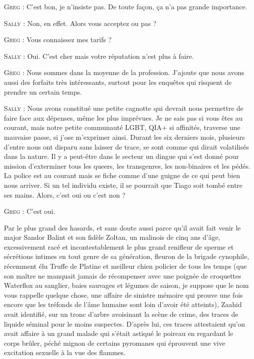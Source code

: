 \begin{dialogue}

\textsc{Greg} : C’est bon, je n’insiste pas. De toute façon, ça n’a pas grande importance.

\textsc{Sally} : Non, en effet. Alors vous acceptez ou pas ?

\textsc{Greg} : Vous connaissez mes tarifs ?

\textsc{Sally} : Oui. C’est cher mais votre réputation n’est plus à faire.

\textsc{Greg} : Nous sommes dans la moyenne de la profession. J’ajoute que nous avons aussi des forfaits très intéressants, surtout pour les enquêtes qui risquent de prendre un certain temps.

\textsc{Sally} : Nous avons constitué une petite cagnotte qui devrait nous permettre de faire face aux dépenses, même les plus imprévues. Je ne sais pas si vous êtes au courant, mais notre petite communauté LGBT, QIA+ si affinités, traverse une mauvaise passe, si j’ose m’exprimer ainsi. Durant les six derniers mois, plusieurs d’entre nous ont disparu sans laisser de trace, se sont comme qui dirait volatilisés dans la nature. Il y a peut-être dans le secteur un dingue qui s’est donné pour mission d’exterminer tous les queers, les transgenres, les non-binaires et les pédés. La police est au courant mais se fiche comme d’une guigne de ce qui peut bien nous arriver. Si un tel individu existe, il se pourrait que Tiago soit tombé entre ses mains. Alors, c’est oui ou c’est non ?

\textsc{Greg} : C’est oui.

\end{dialogue}

Par le plus grand des hasards, et sans doute aussi parce qu’il avait fait venir le major Sandor Balint et son fidèle Zoltan, un malinois de cinq ans d’âge, excessivement racé et incontestablement le plus grand renifleur de sperme et sécrétions intimes en tout genre de sa génération, fleuron de la brigade cynophile, récemment élu Truffe de Platine et meilleur chien policier de tous les temps (que son maître ne manquait jamais de récompenser avec une poignée de croquettes Waterflox au sanglier, baies sauvages et légumes de saison, je suppose que le nom vous rappelle quelque chose, une affaire de sinistre mémoire qui prouve une fois encore que les tréfonds de l’âme humaine sont loin d’avoir été atteints), Zaahid avait identifié, sur un tronc d’arbre avoisinant la scène de crime, des traces de liquide séminal pour le moins suspectes. D’après lui, ces traces attestaient qu’on avait affaire à un grand malade qui s’était astiqué le poireau en regardant le corps brûler, péché mignon de certains pyromanes qui éprouvent une vive excitation sexuelle à la vue des flammes. 

